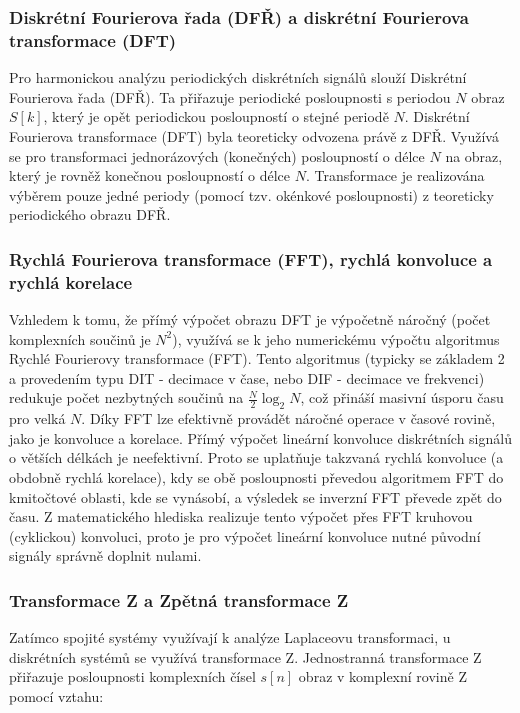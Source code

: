     \subsubsection{Diskrétní Fourierova řada (DFŘ) a diskrétní Fourierova transformace (DFT)} 
        Pro harmonickou analýzu periodických diskrétních signálů slouží Diskrétní Fourierova řada (DFŘ). Ta přiřazuje periodické posloupnosti s periodou $N$ obraz $S[k]$, který je opět periodickou posloupností o stejné periodě $N$. Diskrétní Fourierova transformace (DFT) byla teoreticky odvozena právě z DFŘ. Využívá se pro transformaci jednorázových (konečných) posloupností o délce $N$ na obraz, který je rovněž konečnou posloupností o délce $N$. Transformace je realizována výběrem pouze jedné periody (pomocí tzv. okénkové posloupnosti) z teoreticky periodického obrazu DFŘ.
    \subsubsection{Rychlá Fourierova transformace (FFT), rychlá konvoluce a rychlá korelace} 
        Vzhledem k tomu, že přímý výpočet obrazu DFT je výpočetně náročný (počet komplexních součinů je $N^2$), využívá se k jeho numerickému výpočtu algoritmus Rychlé Fourierovy transformace (FFT). Tento algoritmus (typicky se základem 2 a provedením typu DIT - decimace v čase, nebo DIF - decimace ve frekvenci) redukuje počet nezbytných součinů na $\frac{N}{2} \log_2 N$, což přináší masivní úsporu času pro velká $N$. Díky FFT lze efektivně provádět náročné operace v časové rovině, jako je konvoluce a korelace. Přímý výpočet lineární konvoluce diskrétních signálů o větších délkách je neefektivní. Proto se uplatňuje takzvaná rychlá konvoluce (a obdobně rychlá korelace), kdy se obě posloupnosti převedou algoritmem FFT do kmitočtové oblasti, kde se vynásobí, a výsledek se inverzní FFT převede zpět do času. Z matematického hlediska realizuje tento výpočet přes FFT kruhovou (cyklickou) konvoluci, proto je pro výpočet lineární konvoluce nutné původní signály správně doplnit nulami.

    \subsubsection{Transformace Z a Zpětná transformace Z} 
        Zatímco spojité systémy využívají k analýze Laplaceovu transformaci, u diskrétních systémů se využívá transformace Z. Jednostranná transformace Z přiřazuje posloupnosti komplexních čísel $s[n]$ obraz v komplexní rovině Z pomocí vztahu:
        

